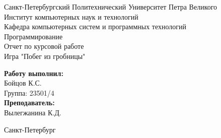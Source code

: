 \documentclass[a4paper]{article}
\begin{document}


\begin{titlepage}	%

	\begin{center}		%

		\large Санкт-Петербургский Политехнический Университет Петра Великого\\
		\large Институт компьютерных наук и технологий \\
		\large Кафедра компьютерных систем и программных технологий\\[6cm]
		
		\huge Программирование\\[0.5cm] %
		\large Отчет по курсовой работе\\[0.1cm]
		\large Игра "Побег из гробницы"\\[5cm]

	\end{center}


	\begin{flushright} %
		\begin{minipage}{0.25\textwidth} %
			\begin{flushleft} %

				\large\textbf{Работу выполнил:}\\
				\large Бойцов К.С.\\
				\large {Группа:} 23501/4\\
				
				\large \textbf{Преподаватель:}\\
				\large Вылегжанина К.Д.
				

			\end{flushleft}
		\end{minipage}
	\end{flushright}
	
	\vfill %

	\begin{center}
	\large Санкт-Петербург\\
	\large \the\year %
	\end{center} %

\thispagestyle{empty} %
\end{titlepage} %
\end{document}
